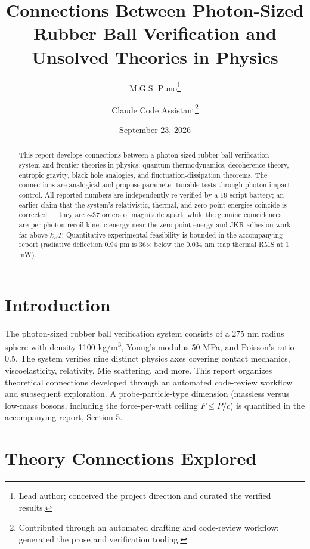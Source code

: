 \documentclass[11pt]{article}
\title{Connections Between Photon-Sized Rubber Ball Verification and Unsolved Theories in Physics}
\author{M.G.S. Puno\thanks{Lead author; conceived the project direction and curated the verified results.}%
\and Claude Code Assistant\thanks{Contributed through an automated drafting and code-review workflow; generated the prose and verification tooling.}}
\date{September 23, 2026}
\begin{document}
\maketitle

\begin{abstract}
This report develops connections between a photon-sized rubber ball verification system and frontier theories in physics: quantum thermodynamics, decoherence theory, entropic gravity, black hole analogies, and fluctuation-dissipation theorems. The connections are analogical and propose parameter-tunable tests through photon-impact control. All reported numbers are independently re-verified by a 19-script battery; an earlier claim that the system's relativistic, thermal, and zero-point energies coincide is corrected — they are $\sim$37 orders of magnitude apart, while the genuine coincidences are per-photon recoil kinetic energy near the zero-point energy and JKR adhesion work far above $k_BT$. Quantitative experimental feasibility is bounded in the accompanying report (radiative deflection 0.94 pm is 36$\times$ below the 0.034 nm trap thermal RMS at 1 mW).
\end{abstract}

\section{Introduction}
The photon-sized rubber ball verification system consists of a 275 nm radius sphere with density 1100 kg/m\textsuperscript{3}, Young's modulus 50 MPa, and Poisson's ratio 0.5. The system verifies nine distinct physics axes covering contact mechanics, viscoelasticity, relativity, Mie scattering, and more. This report organizes theoretical connections developed through an automated code-review workflow and subsequent exploration. A probe-particle-type dimension (massless versus low-mass bosons, including the force-per-watt ceiling $F\le P/c$) is quantified in the accompanying report, Section 5.

\section{Theory Connections Explored}
\end{document}
